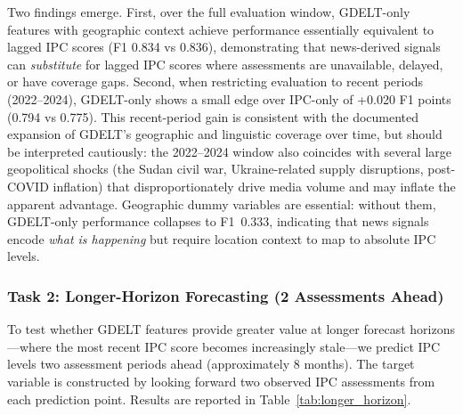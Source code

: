 \documentclass{article}
\begin{document}
Two findings emerge. First, over the full evaluation window, GDELT-only features with geographic context achieve performance essentially equivalent to lagged IPC scores (F1 0.834 vs 0.836), demonstrating that news-derived signals can \textit{substitute} for lagged IPC scores where assessments are unavailable, delayed, or have coverage gaps. Second, when restricting evaluation to recent periods (2022--2024), GDELT-only shows a small edge over IPC-only of +0.020 F1 points (0.794 vs 0.775). This recent-period gain is consistent with the documented expansion of GDELT's geographic and linguistic coverage over time, but should be interpreted cautiously: the 2022--2024 window also coincides with several large geopolitical shocks (the Sudan civil war, Ukraine-related supply disruptions, post-COVID inflation) that disproportionately drive media volume and may inflate the apparent advantage. Geographic dummy variables are essential: without them, GDELT-only performance collapses to F1~0.333, indicating that news signals encode \textit{what is happening} but require location context to map to absolute IPC levels.

\subsubsection{Task 2: Longer-Horizon Forecasting (2 Assessments Ahead)}

To test whether GDELT features provide greater value at longer forecast horizons---where the most recent IPC score becomes increasingly stale---we predict IPC levels two assessment periods ahead (approximately 8 months). The target variable is constructed by looking forward two observed IPC assessments from each prediction point. Results are reported in Table~\ref{tab:longer_horizon}.
\end{document}

